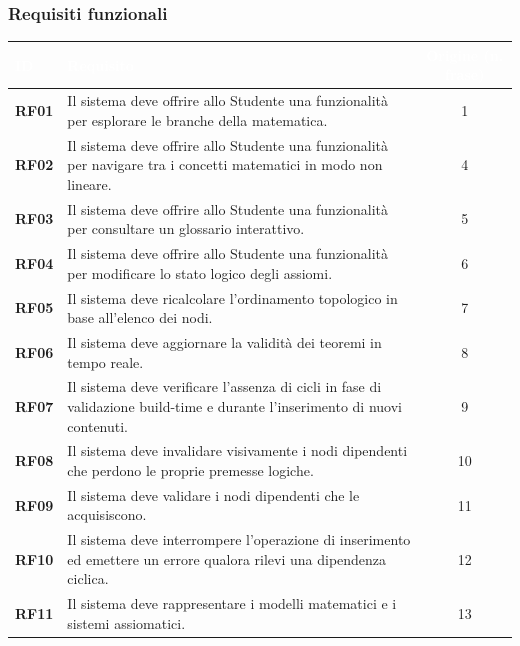 \documentclass[12pt,a4paper]{article}
\begin{document}
\subsubsection{Requisiti funzionali}
\begin{table}[H]
    \centering
    \small
    \begin{tabularx}{\textwidth}{|l|X|c|}
        \hline
        \rowcolor{PrimaryBlue} \textcolor{white}{\textbf{ID}} & \textcolor{white}{\textbf{Requisito}} & \textcolor{white}{\textbf{Origine (n. frase)}} \\
        \hline
        \textbf{RF01} & Il sistema deve offrire allo Studente una funzionalità per esplorare le branche della matematica. & 1 \\
        \hline
        \rowcolor{CodeBg} \textbf{RF02} & Il sistema deve offrire allo Studente una funzionalità per navigare tra i concetti matematici in modo non lineare. & 4 \\
        \hline
        \textbf{RF03} & Il sistema deve offrire allo Studente una funzionalità per consultare un glossario interattivo. & 5 \\
        \hline
        \rowcolor{CodeBg} \textbf{RF04} & Il sistema deve offrire allo Studente una funzionalità per modificare lo stato logico degli assiomi. & 6 \\
        \hline
        \textbf{RF05} & Il sistema deve ricalcolare l'ordinamento topologico in base all'elenco dei nodi. & 7 \\
        \hline
        \rowcolor{CodeBg} \textbf{RF06} & Il sistema deve aggiornare la validità dei teoremi in tempo reale. & 8 \\
        \hline
        \textbf{RF07} & Il sistema deve verificare l'assenza di cicli in fase di validazione build-time e durante l'inserimento di nuovi contenuti. & 9 \\
        \hline
        \rowcolor{CodeBg} \textbf{RF08} & Il sistema deve invalidare visivamente i nodi dipendenti che perdono le proprie premesse logiche. & 10 \\
        \hline
        \textbf{RF09} & Il sistema deve validare i nodi dipendenti che le acquisiscono. & 11 \\
        \hline
        \rowcolor{CodeBg}         \textbf{RF10} & Il sistema deve interrompere l'operazione di inserimento ed emettere un errore qualora rilevi una dipendenza ciclica. & 12 \\
        \hline
        \textbf{RF11} & Il sistema deve rappresentare i modelli matematici e i sistemi assiomatici. & 13 \\

\end{tabularx}
\end{table}
\end{document}
